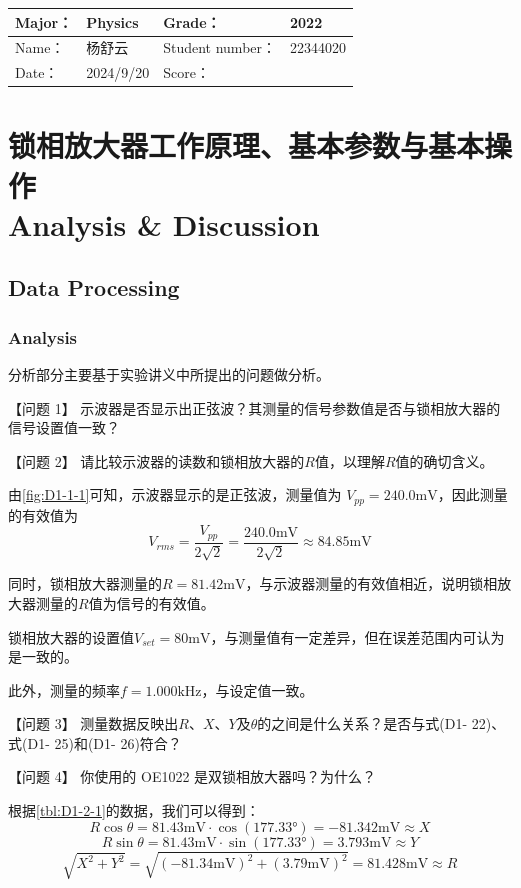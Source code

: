 
\begin{table}
	\renewcommand\arraystretch{1.7}
	\begin{tabularx}{\textwidth}{|X|X|X|X|}
		\hline
		Major：& Physics &Grade：& 2022\\
		\hline
		Name： & 杨舒云 & Student number：& 22344020 \\
		\hline
		Date：& 2024/9/20 & Score： &\\
		\hline
	\end{tabularx}
\end{table}
\section{锁相放大器工作原理、基本参数与基本操作  \\ Analysis \& Discussion}


\subsection{Data Processing}

\subsubsection{Analysis}
分析部分主要基于实验讲义中所提出的问题做分析。
\begin{ubox}{}
	【问题 1】 示波器是否显示出正弦波？其测量的信号参数值是否与锁相放大器的信号设置值一致？
	
	【问题 2】 请比较示波器的读数和锁相放大器的$R$值，以理解$R$值的确切含义。
\end{ubox}
由\cref{fig:D1-1-1}可知，示波器显示的是正弦波，测量值为 $V_{pp} = 240.0 \mathrm{mV}$，因此测量的有效值为
\[
V_{rms} = \frac{V_{pp}}{2 \sqrt{2}} = \frac{240.0 \mathrm{mV}}{2 \sqrt{2}} \approx 84.85 \mathrm{mV}
\]

同时，锁相放大器测量的$R = 81.42 \mathrm{mV}$，与示波器测量的有效值相近，说明锁相放大器测量的$R$值为信号的有效值。

锁相放大器的设置值$V_{set} = 80 \mathrm{mV}$，与测量值有一定差异，但在误差范围内可认为是一致的。

此外，测量的频率$f = 1.000 \mathrm{kHz}$，与设定值一致。

\begin{ubox}{}
	【问题 3】 测量数据反映出$R$、$X$、$Y$及$\theta$的之间是什么关系？是否与式(D1- 22)、式(D1- 25)和(D1- 26)符合？
	
	【问题 4】 你使用的 OE1022 是双锁相放大器吗？为什么？
\end{ubox}
根据\cref{tbl:D1-2-1}的数据，我们可以得到：
\[
R \cos\theta = 81.43 \mathrm{mV} \cdot \cos(177.33°) = -81.342 \mathrm{mV} \approx X 
\]
\[
R \sin\theta = 81.43 \mathrm{mV} \cdot \sin(177.33°) = 3.793 \mathrm{mV} \approx Y 
\]
\[
\sqrt{X^2 + Y^2} = \sqrt{(-81.34 \mathrm{mV})^2 + (3.79 \mathrm{mV})^2} = 81.428 \mathrm{mV} \approx R
\]

